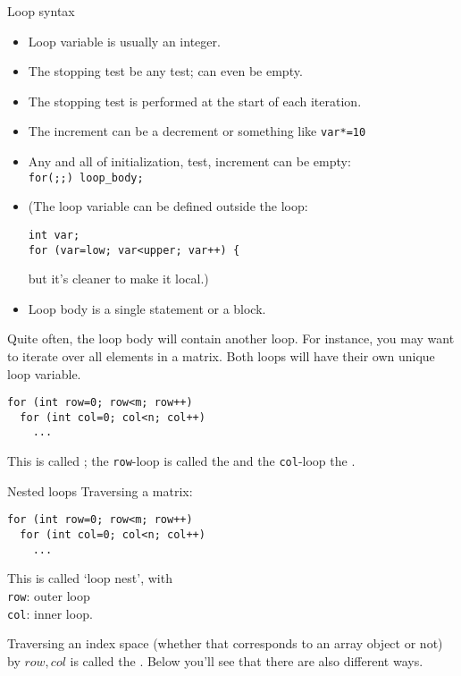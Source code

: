 \begin{slide}{Loop syntax}
  \label{sl:for-syntax}
  \begin{itemize}
  \item Loop variable is usually an integer.
  \item The stopping test be any test; can even be empty.
  \item The stopping test is performed at the start of each iteration.
  \item The increment can be a decrement or something like \lstinline{var*=10}
  \item Any and all of initialization, test, increment can be empty:\\
    \lstinline{for(;;) loop_body;}
  \item (The loop variable can be defined outside the loop:
\begin{lstlisting}
int var;
for (var=low; var<upper; var++) {
\end{lstlisting}
but it's cleaner to make it local.)
\item Loop body is a single statement or a block.
  \end{itemize}
\end{slide}

Quite often, the loop body will contain another loop. For instance,
you may want to iterate over all elements in a matrix. Both loops will
have their own unique loop variable.
\begin{lstlisting}
for (int row=0; row<m; row++)
  for (int col=0; col<n; col++)
    ...
\end{lstlisting}
This is called ; 
the \lstinline{row}-loop is called the  and the
\lstinline{col}-loop the .

\begin{slide}{Nested loops}
  \label{sl:for-nest}
  Traversing a matrix:
\begin{lstlisting}
for (int row=0; row<m; row++)
  for (int col=0; col<n; col++)
    ...
\end{lstlisting}
This is called `loop nest', with\\
\lstinline{row}: outer loop\\
\lstinline{col}: inner loop.
\end{slide}

Traversing an index space (whether that corresponds to an array object
or not) by $row,col$ is called the .
Below you'll see that there are also different
ways.

